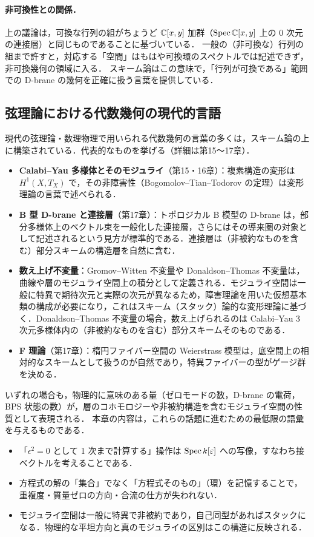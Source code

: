 \paragraph{非可換性との関係．}
上の議論は，可換な行列の組がちょうど $\mathbb{C}[x,y]$ 加群（$\operatorname{Spec}\mathbb{C}[x,y]$ 上の 0 次元の連接層）と同じものであることに基づいている．
一般の（非可換な）行列の組まで許すと，対応する「空間」はもはや可換環のスペクトルでは記述できず，非可換幾何の領域に入る．
スキーム論はこの意味で，「行列が可換である」範囲での D-brane の幾何を正確に扱う言葉を提供している．

\subsection{弦理論における代数幾何の現代的言語}

現代の弦理論・数理物理で用いられる代数幾何の言葉の多くは，スキーム論の上に構築されている．代表的なものを挙げる（詳細は第15〜17章）．
\begin{itemize}
  \item \textbf{Calabi--Yau 多様体とそのモジュライ}（第15・16章）：複素構造の変形は $H^1(X,T_X)$ で，その非障害性（Bogomolov--Tian--Todorov の定理）は変形理論の言葉で述べられる．
  \item \textbf{B 型 D-brane と連接層}（第17章）：トポロジカル B 模型の D-brane は，部分多様体上のベクトル束を一般化した連接層，さらにはその導来圏の対象として記述されるという見方が標準的である．連接層は（非被約なものを含む）部分スキームの構造層を自然に含む．
  \item \textbf{数え上げ不変量}：Gromov--Witten 不変量や Donaldson--Thomas 不変量は，曲線や層のモジュライ空間上の積分として定義される．モジュライ空間は一般に特異で期待次元と実際の次元が異なるため，障害理論を用いた仮想基本類の構成が必要になり，これはスキーム（スタック）論的な変形理論に基づく．Donaldson--Thomas 不変量の場合，数え上げられるのは Calabi--Yau 3 次元多様体内の（非被約なものを含む）部分スキームそのものである．
  \item \textbf{F 理論}（第17章）：楕円ファイバー空間の Weierstrass 模型は，底空間上の相対的なスキームとして扱うのが自然であり，特異ファイバーの型がゲージ群を決める．
\end{itemize}
いずれの場合も，物理的に意味のある量（ゼロモードの数，D-brane の電荷，BPS 状態の数）が，層のコホモロジーや非被約構造を含むモジュライ空間の性質として表現される．
本章の内容は，これらの話題に進むための最低限の語彙を与えるものである．

\begin{physbox}
\begin{itemize}
  \item 「$\epsilon^2=0$ として 1 次まで計算する」操作は $\operatorname{Spec} k[\varepsilon]$ への写像，すなわち接ベクトルを考えることである．
  \item 方程式の解の「集合」でなく「方程式そのもの」（環）を記憶することで，重複度・質量ゼロの方向・合流の仕方が失われない．
  \item モジュライ空間は一般に特異で非被約であり，自己同型があればスタックになる．物理的な平坦方向と真のモジュライの区別はこの構造に反映される．
\end{itemize}
\end{physbox}

